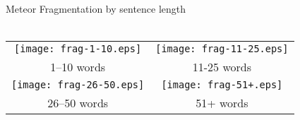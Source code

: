 \documentclass[landscape]{article}
\begin{document}
\newpage

\noindent\Large
Meteor Fragmentation by sentence length\\\\
\large
\begin{tabular}{cc}
\texttt{[image: frag-1-10.eps]} & \texttt{[image: frag-11-25.eps]} \\
1--10 words & 11-25 words \\
\texttt{[image: frag-26-50.eps]} & \texttt{[image: frag-51+.eps]} \\
26--50 words & 51+ words \\
\end{tabular}
\end{document}
